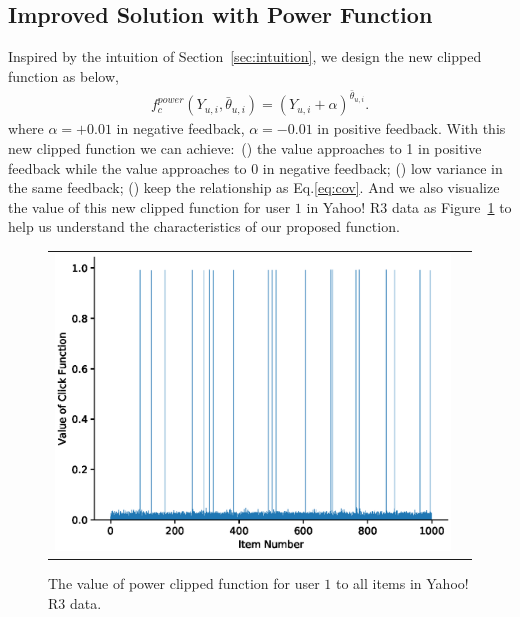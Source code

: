 \documentclass[sigconf]{acmart}
\begin{document}
\subsection{Improved Solution with Power Function} \label{sec:improve}
Inspired by the intuition of Section~\ref{sec:intuition}, we design the new clipped function as below, 
\begin{eqnarray}\label{eq:clippedTFPower}
	f_{c}^{power}({Y_{u,i}}, {\bar{\theta}_{u,i}}) =  \left({Y_{u,i} + \alpha}\right)^{\bar{\theta}_{u,i}}.
\end{eqnarray}
where $\alpha = +0.01$ in negative feedback, $\alpha = -0.01$ in positive feedback. With this new clipped function we can achieve$\colon$ () the value approaches to 1 in positive feedback while the value approaches to 0 in negative feedback; () low variance in the same feedback; () keep the relationship as Eq.\eqref{eq:cov}. And we also visualize the value of this new clipped function for user $1$ in Yahoo! R3 data as Figure~\ref{fig:powerClickFunction} to help us understand the characteristics of our proposed function.

\begin{figure}[!htb]
	
	\begin{center}
		
		\begin{tabular}{cc}
			
			\includegraphics[width=\columnwidth]{fig/powerClickFunction.eps}
			
			
		\end{tabular}
		
	\end{center}
	\caption{The value of power clipped function for user $1$ to all items in Yahoo! R3 data.}
	
	\label{fig:powerClickFunction}
\end{figure} 
\end{document}
